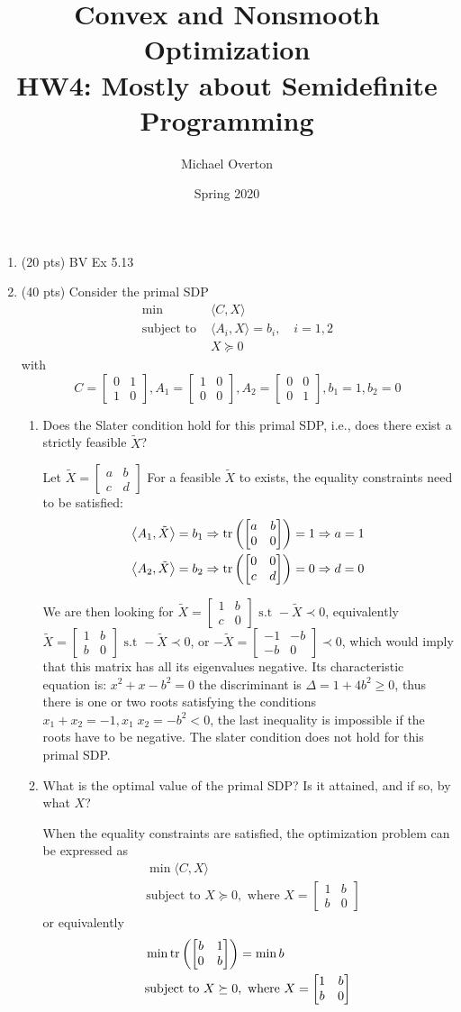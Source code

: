 \documentclass[11pt]{article}
\title{Convex and Nonsmooth Optimization\\
HW4: Mostly about Semidefinite Programming}
\author{Michael Overton}
\date{Spring 2020}
\newcommand{\st}{\text{subject to }}
\newcommand{\ip}[2]{\langle #1, #2 \rangle}
\newcommand{\twomat}[4]{\begin{bmatrix} #1 & #2 \\ #3 & #4 \end{bmatrix}}
\begin{document}
\maketitle
\begin{enumerate}
\item (20 pts) BV Ex 5.13
\item (40 pts) Consider the primal SDP 
\begin{align*}
\min & \ip{C}{X}\\
\st & \ip{A_i}{X}=b_i, \quad i=1,2\\
     &  X \succeq 0
\end{align*}
with 
\[
     C = \twomat{ 0}{1}{1}{0}, A_1=\twomat{1}{0}{0}{0}, A_2=\twomat{0}{0}{0}{1}, b_1=1, b_2=0
\]
\begin{enumerate}
\item Does the Slater condition hold for this primal SDP, i.e., does there exist a strictly feasible $\tilde X$?\\
\medskip

Let $\tilde X = \twomat{a}{b}{c}{d}$ 
For a feasible $\tilde X$ to exists, the equality constraints need to be satisfied:
\begin{align*}
	\PROD{A_1}{\tilde X}	&=	b_1 \Rightarrow \tr{  \twomat{a}{b}{0}{0}  } = 1 \Rightarrow  a = 1 \\
	\PROD{A_2}{\tilde X}	&=	b_2 \Rightarrow \tr{  \twomat{0}{0}{c}{d}  } = 0 \Rightarrow d = 0 \\
\end{align*}

We are then looking for  $\tilde X = \twomat{1}{b}{c}{0}  \text{ s.t }- \tilde X \prec 0$, equivalently $\tilde X = \twomat{1}{b}{b}{0} \text{ s.t } - \tilde X \prec 0$, or
$-\tilde X = \twomat{-1}{-b}{-b}{0} \prec 0$, which would imply that this matrix has all its eigenvalues negative. Its characteristic equation is: $x^2 + x - b^2 = 0$
the discriminant is $\Delta = 1 + 4 b^2  \ge 0$, thus there is one or two roots satisfying the conditions $x_1 + x_2 = -1 , x_1 \; x_2 = -b^2 < 0$, the last inequality is impossible
if the roots have to be negative. The slater condition does not hold for this primal SDP.


\item What is the optimal value of the primal SDP?  Is it attained, and if so, by what $X$?

When the equality constraints are satisfied, the optimization problem can be expressed as
\begin{align*}
	& \min \ip{C}{X}\\
	& \st X \succeq 0, \text{ where }  X = \twomat{1}{b}{b}{0} 
\end{align*}
or equivalently
\begin{align*}
	& \min \tr{ \twomat{b}{1}{0}{b} } = \min b\\
	& \st X \succeq 0, \text{ where }  X = \twomat{1}{b}{b}{0} 
\end{align*}


\end{enumerate}
\end{enumerate}
\end{document}
